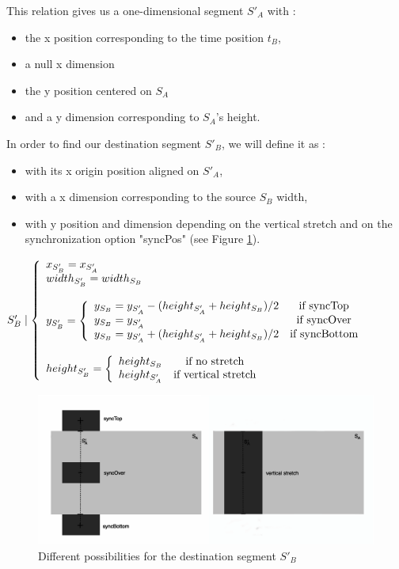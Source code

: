 \documentclass[a4paper]{article}
\begin{document}
This relation gives us a one-dimensional segment $S'_A$ with :
\begin{itemize}
  \item the x position corresponding to the time position $t_B$, 
  \item a null x dimension
  \item the y position centered on $S_A$
  \item and a y dimension corresponding to $S_A$'s height.
\end{itemize} 


In order to find our destination segment $S'_B$, we will define it as :
\begin{itemize}
  \item with its x origin position aligned on $S'_A$,
  \item with a x dimension corresponding to the source $S_B$ width,
  \item with y position and dimension depending on the vertical stretch and on the synchronization option "syncPos" (see Figure \ref{fig:possibleDestRect}).
\end{itemize}


$S'_B \mid \left\lbrace 
\begin{array}{lcl} 
x_{S'_B} = x_{S'_A}\\
\bigskip
width_{S'_B} = width_{S_B}\\
\bigskip
y _{S'_B} = \left\lbrace
\begin{array}{lcl}
y_{S_B} = y_{S'_A} - (height_{S'_A} + height_{S_B})/2 & \text{if syncTop}\\ 
y_{S_B} = y_{S'_A} & \text{if syncOver}\\
y_{S_B} = y_{S'_A} + (height_{S'_A} + height_{S_B})/2 & \text{if syncBottom}
\end{array}\right.\\
height _{S'_B} = \left\lbrace
\begin{array}{lcl}
height_{S_B} & \text{if no stretch}\\
height_{S'_A} & \text{if vertical stretch}
\end{array}\right.\\
\end{array}\right.$

\begin{figure}[h]
\begin{center}
\includegraphics[width=16cm]{img/top_over_bottomF.png}
\caption{Different possibilities for the destination segment $S'_B$}
\label{fig:possibleDestRect}
\end{center}
\end{figure}
\end{document}
